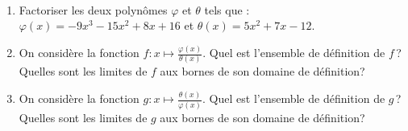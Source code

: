 %
      \begin{exo}~\\
\label{exo:fn facto2}
            \begin{enumerate}
                  \item Factoriser les deux polyn\^omes $\varphi$ et $\theta$ tels que :
                        $\varphi (x) = -9x^3 -15x^2 + 8x + 16$ et $\theta (x) = 5x^2 + 7x - 12$.
                  \item On consid\`ere la fonction $f : x \mapsto \frac{\varphi (x)}{\theta (x)}$.
                        Quel est l'ensemble de d\'efinition de $f$\,? 
                        Quelles sont les limites de $f$ aux bornes de son domaine de d\'efinition?
                  \item On consid\`ere la fonction $g : x \mapsto \frac{\theta (x)}{\varphi (x)}$.
                        Quel est l'ensemble de d\'efinition de $g$\,? 
                        Quelles sont les limites de $g$ aux bornes de son domaine de d\'efinition?
            \end{enumerate}
      \end{exo}
%
